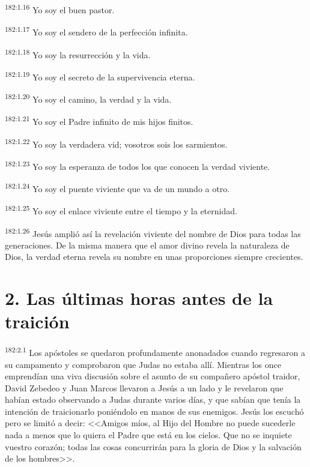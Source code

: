 \par 
\textsuperscript{182:1.16} Yo soy el buen pastor.

\par 
\textsuperscript{182:1.17} Yo soy el sendero de la perfección infinita.

\par 
\textsuperscript{182:1.18} Yo soy la resurrección y la vida.

\par 
\textsuperscript{182:1.19} Yo soy el secreto de la supervivencia eterna.

\par 
\textsuperscript{182:1.20} Yo soy el camino, la verdad y la vida.

\par 
\textsuperscript{182:1.21} Yo soy el Padre infinito de mis hijos finitos.

\par 
\textsuperscript{182:1.22} Yo soy la verdadera vid; vosotros sois los sarmientos.

\par 
\textsuperscript{182:1.23} Yo soy la esperanza de todos los que conocen la verdad viviente.

\par 
\textsuperscript{182:1.24} Yo soy el puente viviente que va de un mundo a otro.

\par 
\textsuperscript{182:1.25} Yo soy el enlace viviente entre el tiempo y la eternidad.

\par 
\textsuperscript{182:1.26} Jesús amplió así la revelación viviente del nombre de Dios para todas las generaciones. De la misma manera que el amor divino revela la naturaleza de Dios, la verdad eterna revela su nombre en unas proporciones siempre crecientes.

\section*{2. Las últimas horas antes de la traición}
\par 
\textsuperscript{182:2.1} Los apóstoles se quedaron profundamente anonadados cuando regresaron a su campamento y comprobaron que Judas no estaba allí. Mientras los once emprendían una viva discusión sobre el asunto de su compañero apóstol traidor, David Zebedeo y Juan Marcos llevaron a Jesús a un lado y le revelaron que habían estado observando a Judas durante varios días, y que sabían que tenía la intención de traicionarlo poniéndolo en manos de sus enemigos. Jesús los escuchó pero se limitó a decir: <<Amigos míos, al Hijo del Hombre no puede sucederle nada a menos que lo quiera el Padre que está en los cielos. Que no se inquiete vuestro corazón; todas las cosas concurrirán para la gloria de Dios y la salvación de los hombres>>.

